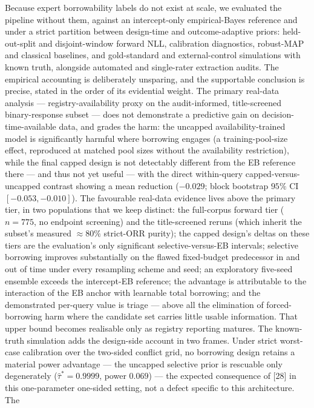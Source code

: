 \documentclass[11pt]{article}
\begin{document}
Because expert borrowability labels do not exist at scale, we evaluated the
pipeline without them, against an intercept-only empirical-Bayes reference and
under a strict partition between design-time and outcome-adaptive priors:
held-out-split and disjoint-window forward NLL, calibration diagnostics,
robust-MAP and classical baselines, and gold-standard and external-control
simulations with known truth, alongside automated and single-rater extraction
audits. The
empirical accounting is deliberately unsparing, and the supportable
conclusion is precise, stated in the order of its evidential weight. The
primary real-data analysis --- registry-availability proxy on the
audit-informed, title-screened binary-response subset --- does not
demonstrate a
predictive gain on decision-time-available data, and grades the harm: the
uncapped availability-trained model is significantly harmful where borrowing
engages (a training-pool-size effect, reproduced at matched pool sizes
without the availability restriction), while the final capped design is
not detectably different from the EB reference there --- and thus not
yet useful --- with the direct within-query capped-versus-uncapped
contrast showing a mean reduction ($-0.029$; block bootstrap $95\%$ CI
$[-0.053,-0.010]$). The favourable
real-data
evidence lives above the primary tier, in two populations that we keep
distinct: the full-corpus forward tier ($n=775$, no endpoint screening)
and the title-screened reruns (which inherit the subset's measured
$\approx 80\%$ strict-ORR purity); the capped design's deltas on these
tiers are the evaluation's only significant
selective-versus-EB intervals; selective borrowing improves substantially
on the flawed fixed-budget predecessor in and out of time under every
resampling scheme and seed; an exploratory five-seed ensemble exceeds the
intercept-EB reference; the advantage is attributable to the interaction of
the EB anchor with learnable total borrowing; and the demonstrated
per-query value is triage --- above all the elimination of forced-borrowing
harm where the candidate set carries little usable information. That upper
bound becomes realisable only as registry reporting matures. The
known-truth simulation adds the design-side account in two frames. Under
strict worst-case calibration over the two-sided conflict grid, no
borrowing design retains a material power advantage --- the uncapped
selective prior is rescuable only degenerately ($\hat\tau^{*} = 0.9999$,
power $0.069$) --- the expected consequence of [28] in this one-parameter
one-sided setting, not a defect specific to this architecture. The
\end{document}

